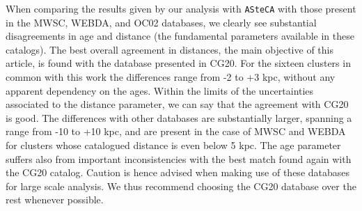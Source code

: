 \documentclass{aa}
\begin{document}
  When comparing the results given by our analysis with \texttt{ASteCA} with
  those present in the MWSC, WEBDA, and OC02 databases, we clearly
  see substantial disagreements in age and distance (the fundamental
  parameters available in these catalogs).
  The best overall agreement in distances, the main objective of this article,
  is found with the database presented in CG20. For the sixteen clusters in
  common with this work the differences range from -2 to +3 kpc, without any
  apparent dependency on the ages. Within the limits of the uncertainties
  associated to the distance parameter, we can say that the agreement with
  CG20 is good.
  The differences with other databases are substantially larger, spanning a
  range from -10 to +10 kpc, and are present in the case of MWSC and WEBDA for
  clusters whose catalogued distance is even below 5 kpc.
  The age parameter suffers also from important inconsistencies with
  the best match found again with the CG20 catalog.
  Caution is hence advised when making use of these databases for large scale
  analysis. We thus recommend choosing the CG20 database over the rest whenever
  possible.







\end{document}
